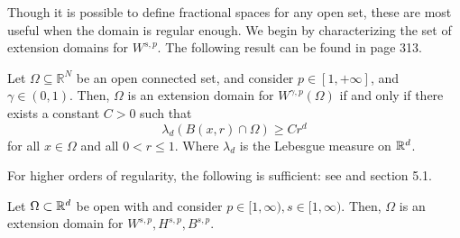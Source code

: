 \documentclass[
    a4paper,
    DIV=14,
    abstract=true,
    numbers=noenddot
]{scrartcl}
\begin{document}
Though it is possible to define fractional spaces for any open set, these are most useful when the domain is regular enough. We begin by characterizing the set of extension domains for $W^{s,p}$. The following result can be found in \cite{leoni2017first} page 313.
\begin{theorem}\label{plump sets}
    Let $\Omega \subseteq \mathbb{R}^N$ be an open connected set, and consider $p\in [1,+\infty]$, and $\gamma\in (0,1)$. Then, $\Omega$ is an extension domain for $W^{\gamma, p}(\Omega)$ if and only if there exists a constant $C>0$ such that
    $$
        \lambda_d(B(x, r) \cap \Omega) \geq C r^d
    $$
    for all $x \in \Omega$ and all $0<r \leq 1$. Where $\lambda_d$ is the Lebesgue measure on $\mathbb{R}^d$.
\end{theorem}
For higher orders of regularity, the following is sufficient: see \cite{leoni2023first} and \cite{sawano2018theory} section 5.1.
\begin{theorem}
    Let $\Omega \subset \mathbb{R}^d$ be open with  and consider   $p\in [1,\infty), s\in[1,\infty)$. Then, $\Omega $ is an extension domain for $W^{s,p},H^{s,p},B^{s,p}$.
\end{theorem}
\end{document}
